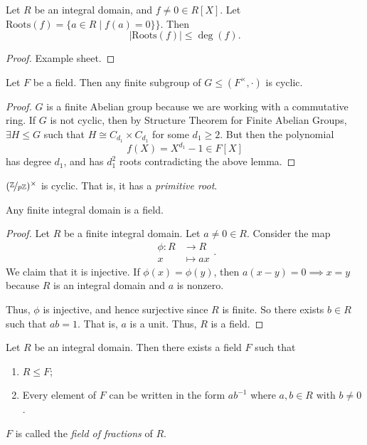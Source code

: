 \leavevmode
\begin{lemma}
    Let \(R\) be an integral domain, and \(f \neq 0 \in R[X]\). Let \(\mathrm{Roots}(f)=\{a\in R \mid f(a) = 0\}\}\). Then
    \[
        \left\vert \mathrm{Roots}(f) \right\vert \leq \deg(f).
    \]
\end{lemma}
\begin{proof}
    Example sheet.
\end{proof}
\begin{theorem}
    Let \(F\) be a field. Then any finite subgroup of \(G \leq (F^\times, \cdot)\) is cyclic.
\end{theorem}
\begin{proof}
    \(G\) is a finite Abelian group because we are working with a commutative ring. If \(G\) is not cyclic, then by Structure Theorem for Finite Abelian Groups, \(\exists H \leq G\) such that \(H \cong C_{d_1}\times C_{d_1}\) for some \(d_1 \geq 2\). But then the polynomial
    \[
        f(X) = X^{d_1} - 1 \in F[X]
    \]
    has degree \(d_1\), and has \(d_1^2\) roots contradicting the above lemma.
\end{proof}
\begin{example}
    \((\nicefrac{\mathbb{Z}}{p\mathbb{Z}})^\times \) is cyclic. That is, it has a \textit{primitive root}.
\end{example}
\begin{proposition}
    Any finite integral domain is a field.
\end{proposition}
\begin{proof}
    Let \(R\) be a finite integral domain. Let \(a \neq 0 \in R\). Consider the map
    \[
    \begin{aligned}
      \phi\colon R & \longrightarrow R      \\
      x          & \longmapsto ax
    \end{aligned}.
    \]
    We claim that it is injective. If \(\phi(x) = \phi(y)\), then \(a(x-y) = 0 \implies x = y\) because \(R\) is an integral domain and \(a\) is nonzero.

    Thus, \(\phi\) is injective, and hence surjective since \(R\) is finite. So there exists \(b \in R\) such that \(ab = 1\). That is, \(a\) is a unit. Thus, \(R\) is a field.
\end{proof}
\begin{theorem}
    Let \(R\) be an integral domain. Then there exists a field \(F\) such that
    \begin{enumerate}
        \item \(R \leq F\);
        \item Every element of \(F\) can be written in the form \(a b^{-1}\) where \(a,b \in R\) with \(b \neq 0\).
    \end{enumerate}

    \(F\) is called the \textit{field of fractions} of \(R\).
\end{theorem}
